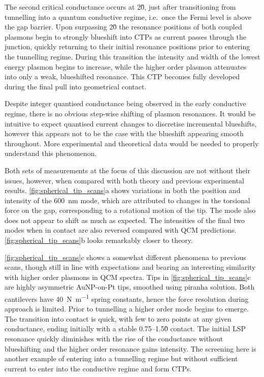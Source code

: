 \documentclass[a4paper, 11pt]{article}
\begin{document}
The second critical conductance occurs at 2\G0, just after transitioning from tunnelling into a quantum conductive regime, i.e.\ once the Fermi level is above the gap barrier. Upon surpassing 2\G0 the resonance positions of both coupled plasmons begin to strongly blueshift into CTPs as current passes through the junction, quickly returning to their initial resonance positions prior to entering the tunnelling regime. During this transition the intensity and width of the lowest energy plasmon begins to increase, while the higher order plasmon attenuates into only a weak, blueshifted resonance. This CTP becomes fully developed during the final pull into geometrical contact. %

Despite integer quantised conductance being observed in the early conductive regime, there is no obvious step-wise shifting of plasmon resonances. It would be intuitive to expect quantised current changes to discretise incremental blueshifts, however this appears not to be the case with the blueshift appearing smooth throughout. More experimental and theoretical data would be needed to properly understand this phenomenon.

Both sets of measurements at the focus of this discussion are not without their issues, however, when compared with both theory and previous experimental results. \autoref{fig:spherical_tip_scans}a shows variations in both the position and intensity of the \SI{600}{nm} mode, which are attributed to changes in the torsional force on the gap, corresponding to a rotational motion of the tip. The mode also does not appear to shift as much as expected. The intensities of the final two modes when in contact are also reversed compared with QCM predictions. \autoref{fig:spherical_tip_scans}b looks remarkably closer to theory.

\autoref{fig:spherical_tip_scans}c shows a somewhat different phenomena to previous scans, though still in line with expectations and bearing an interesting similarity with higher order plasmons in QCM spectra. Tips in \autoref{fig:spherical_tip_scans}c are highly asymmetric AuNP-on-Pt tips, smoothed using piranha solution. Both cantilevers have \SI{40}{N.m^{-1}} spring constants, hence the force resolution during approach is limited. Prior to tunnelling a higher order mode begins to emerge. The transition into contact is quick, with few to zero points at any given conductance, ending initially with a stable 0.75--1.5\G0 contact. The initial LSP resonance quickly diminishes with the rise of the conductance without blueshifting and the higher order resonance gains intensity. The screening here is another example of entering into a tunnelling regime but without sufficient current to enter into the conductive regime and form CTPs.
\end{document}

